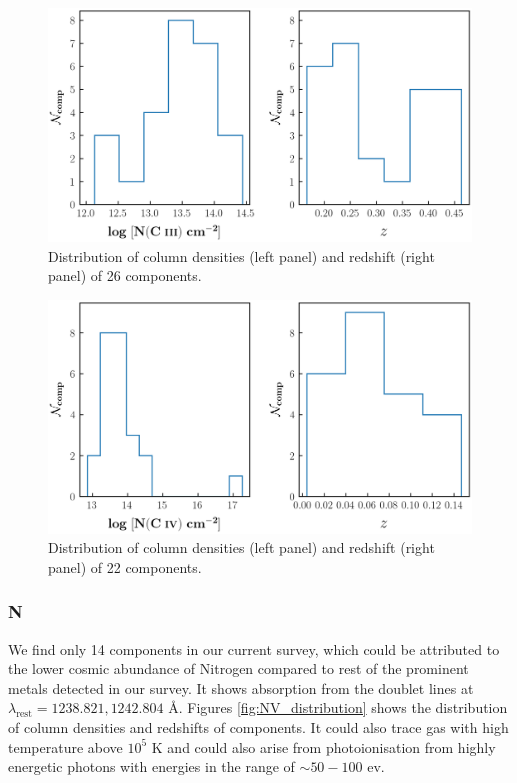 \begin{figure}
    \centering
    \includegraphics[width=\linewidth]{Figures/CIII_distribution_survey.png}
    \caption{Distribution of column densities (left panel) and redshift (right panel) of 26  components.}
    \label{fig:CIII_distribution}
\end{figure}

\begin{figure}
    \centering
    \includegraphics[width=\linewidth]{Figures/CIV_distribution_survey.png}
    \caption{Distribution of column densities (left panel) and redshift (right panel) of 22  components.}
    \label{fig:CIV_distribution}
\end{figure}


\subsubsection*{N \hspace*{-0.5mm}{\footnotesize V}}

We find only 14  components in our current survey, which could be attributed to the lower cosmic abundance of Nitrogen compared to rest of the prominent metals detected in our survey. It shows absorption from the doublet lines at $\lambda_\text{rest}=1238.821, 1242.804$ \AA. Figures \ref{fig:NV_distribution} shows the distribution of column densities and redshifts of  components. It could also trace gas with high temperature above $10^5$ K and could also arise from photoionisation from highly energetic photons with energies in the range of $\sim 50-100$ ev.


